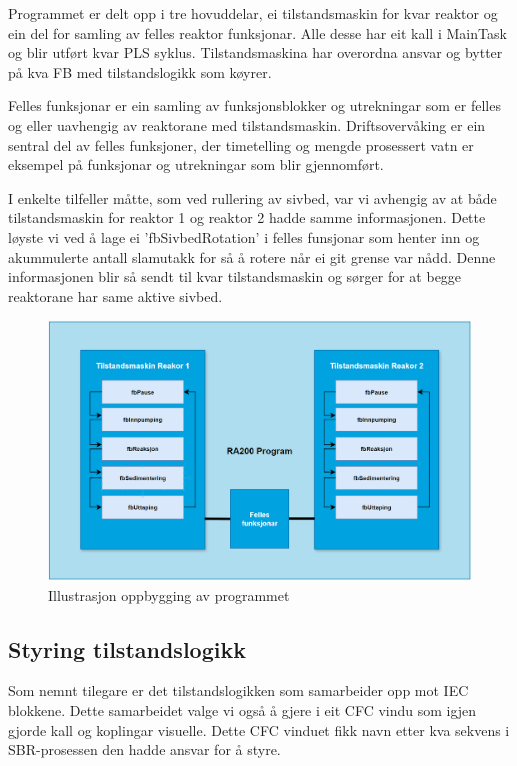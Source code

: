 Programmet er delt opp i tre hovuddelar, ei tilstandsmaskin for kvar reaktor og ein del for samling av felles reaktor funksjonar.
Alle desse har eit kall i MainTask og blir utført kvar PLS syklus. Tilstandsmaskina har overordna ansvar og bytter på kva 
\gls{FB} med tilstandslogikk som køyrer.

Felles funksjonar er ein samling av funksjonsblokker og utrekningar som er felles og eller uavhengig av reaktorane med tilstandsmaskin.
Driftsovervåking er ein sentral del av felles funksjoner, der timetelling og mengde prosessert vatn er eksempel på funksjonar og utrekningar
som blir gjennomført.

I enkelte tilfeller måtte, som ved rullering av sivbed, var vi avhengig av at både tilstandsmaskin for reaktor 1 og reaktor 2 hadde samme informasjonen.
Dette løyste vi ved å lage ei 'fbSivbedRotation' i felles funsjonar som henter inn og akummulerte antall slamutakk for så å rotere når ei git grense var nådd.
Denne informasjonen blir så sendt til kvar tilstandsmaskin og sørger for at begge reaktorane har same aktive sivbed.


\begin{figure}[htbp]
    \centering
    \includegraphics[width=1\textwidth]{Figurar/Oppbygging_Program.png}
    \caption{Illustrasjon oppbygging av programmet}\label{fig:reaktorsoner}
\end{figure}


\newpage

\subsection{Styring tilstandslogikk}

Som nemnt tilegare er det tilstandslogikken som samarbeider opp mot IEC blokkene. Dette samarbeidet valge vi også å gjere i eit
CFC vindu som igjen gjorde kall og koplingar visuelle. Dette CFC vinduet fikk navn etter kva sekvens i SBR-prosessen
den hadde ansvar for å styre. 

